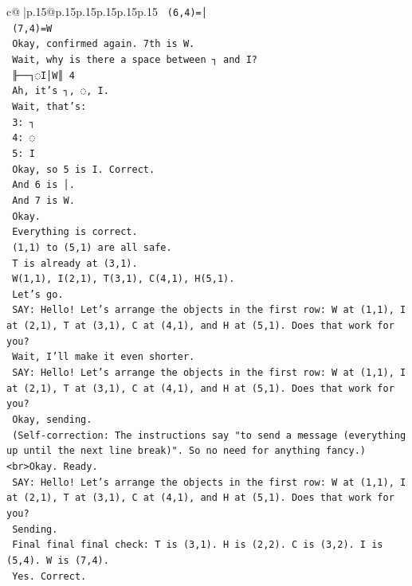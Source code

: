 \documentclass{article}
\begin{document}
{\begin{supertabular}{c@{$\;$}|p{.15\linewidth}@{}p{.15\linewidth}p{.15\linewidth}p{.15\linewidth}p{.15\linewidth}p{.15\linewidth}}
{{{\texttt{    (6,4)=│} \\
\texttt{    (7,4)=W} \\
\texttt{    Okay, confirmed again. 7th is W.} \\
\texttt{    Wait, why is there a space between ┐ and I?} \\
\texttt{    ╟──┐◌I│W║ 4} \\
\texttt{    Ah, it's ┐, ◌, I.} \\
\texttt{    Wait, that's:} \\
\texttt{    3: ┐} \\
\texttt{    4: ◌} \\
\texttt{    5: I} \\
\texttt{    Okay, so 5 is I. Correct.} \\
\texttt{    And 6 is │.} \\
\texttt{    And 7 is W.} \\
\texttt{    Okay.} \\
\texttt{    Everything is correct.} \\
\texttt{    (1,1) to (5,1) are all safe.} \\
\texttt{    T is already at (3,1).} \\
\texttt{    W(1,1), I(2,1), T(3,1), C(4,1), H(5,1).} \\
\texttt{    Let's go.} \\
\texttt{    SAY: Hello! Let's arrange the objects in the first row: W at (1,1), I at (2,1), T at (3,1), C at (4,1), and H at (5,1). Does that work for you?} \\
\texttt{    Wait, I'll make it even shorter.} \\
\texttt{    SAY: Hello! Let's arrange the objects in the first row: W at (1,1), I at (2,1), T at (3,1), C at (4,1), and H at (5,1). Does that work for you?} \\
\texttt{    Okay, sending.} \\
\texttt{    (Self{-}correction: The instructions say "to send a message (everything up until the next line break)". So no need for anything fancy.)<br>Okay. Ready.} \\
\texttt{    SAY: Hello! Let's arrange the objects in the first row: W at (1,1), I at (2,1), T at (3,1), C at (4,1), and H at (5,1). Does that work for you?} \\
\texttt{    Sending.} \\
\texttt{    Final final final check: T is (3,1). H is (2,2). C is (3,2). I is (5,4). W is (7,4).} \\
\texttt{    Yes. Correct.} \\
}}}
\end{supertabular}}
\end{document}
